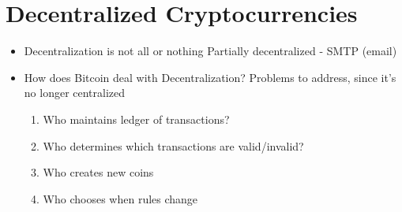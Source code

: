 \documentclass{article}
\begin{document}
\section*{Decentralized Cryptocurrencies}
\begin{itemize}
  \item Decentralization is not all or nothing
    \subitem Partially decentralized - SMTP (email)
  \item How does Bitcoin deal with Decentralization?
    \subitem Problems to address, since it's no longer centralized
    \begin{enumerate}
      \item Who maintains ledger of transactions?
      \item Who determines which transactions are valid/invalid?
      \item Who creates new coins
      \item Who chooses when rules change
    \end{enumerate}
\end{itemize}
\end{document}
